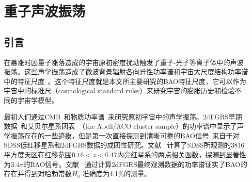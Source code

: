 \chapter{重子声波振荡}
\label{cha:bao}

\section{引言}
在暴涨时因量子涨落造成的宇宙原初密度扰动触发了重子-光子等离子体中的声波振荡。这些声学振荡造成了微波背景辐射各向异性功率谱和宇宙大尺度结构功率谱中的特征尺度~\cite{Sakharov1966,Peebles1970,Sunyaev1970,Blake2003,Seo2003}。这个特征尺度就是本文所主要研究的BAO特征尺度，它可以作为宇宙中的标准尺（cosmological standard ruler）来研究宇宙的膨胀历史和检验不同的宇宙学模型。

最初人们通过CMB~\cite{Bond1984,Bond1987,Jungman1996,Hu1996s,Hu1996w,Hu1997}和物质功率谱~\cite{Kamionkowski1994,Jungman1996,Hu1996s,Eisenstein1998,Meiksin1999}来研究原初宇宙中的声学振荡。2dFGRS早期数据~\cite{Percival2001,Efstathiou2002,Percival2002}和艾贝尔星系团表~\cite{Miller1999}（the Abell/ACO cluster sample）的功率谱中显示了声学振荡存在的一些迹象，但是第一次直接探测到清晰可靠的BAO信号~\cite{Eisenstein2005,Cole2005}来自于对SDSS低红移星系和2dFGRS数据的成团性研究。文献 ~计算了SDSS所观测的3816平方度天区在红移范围$0.16 < z < 0.47$内亮红星系的两点相关函数，探测到显著性为$3.4\sigma$的BAO信号。文献 ~通过计算2dFGRS最终观测数据的功率谱证实了BAO的存在并得到对哈勃常数$H_0$ 准确度为4.1\%的测量。

